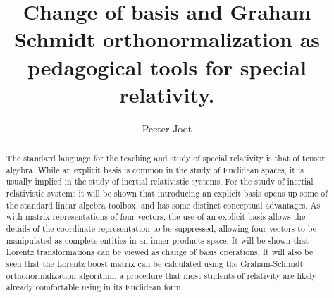 \documentclass[iop,tighten]{emulateapj}
\begin{document}
\title{Change of basis and Graham Schmidt orthonormalization as pedagogical tools for special relativity.}

\author{
Peeter Joot 
}


\begin{abstract}

The standard language for the teaching and study of special relativity is that of tensor algebra.  
While an explicit basis is common in the study of Euclidean spaces, it is usually implied in the study of inertial relativistic systems.  
For the study of inertial relativistic systems it will be shown that introducing an explicit basis opens up some of the standard linear algebra toolbox, and has some distinct conceptual advantages.
As with matrix representations of four vectors, the use of an explicit basis allows the details of the coordinate representation to be suppressed, allowing four vectors to be manipulated as complete entities in an inner products space.
It will be shown that Lorentz transformations can be viewed as change of basis operations.  It will also be seen that the Lorentz boost matrix can be calculated using the Graham-Schmidt orthonormalization algorithm, a procedure that most students of relativity are likely already comfortable using in its Euclidean form.

\end{abstract}

\end{document}
